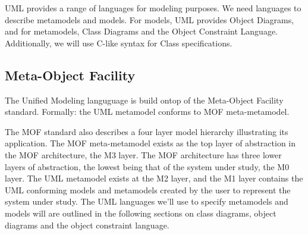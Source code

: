UML provides a range of languages for modeling purposes.
We need languages to describe metamodels and models.
For models, UML provides Object Diagrams, and for metamodels, Class Diagrams and the Object Constraint Language.
Additionally, we will use C-like syntax for Class specifications.

\subsection{Meta-Object Facility}
The Unified Modeling languguage is build ontop of the Meta-Object Facility standard.
Formally: the UML metamodel conforms to MOF meta-metamodel. 

The MOF standard also describes a four layer model hierarchy illustrating its application.
The MOF meta-metamodel exists as the top layer of abstraction in the MOF architecture, the M3 layer.
The MOF architecture has three lower layers of abstraction, the lowest being that of the system under study, the M0 layer.
The UML metamodel exists at the M2 layer, and the M1 layer contains the UML conforming models and metamodels created by the user to represent the system under study.
The UML languages we'll use to specify metamodels and models will are outlined in the following sections on class diagrams, object diagrams and the object constraint language.

